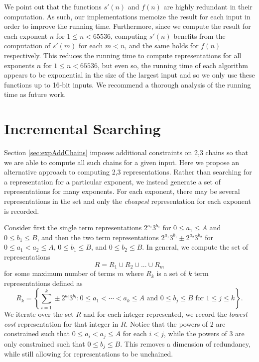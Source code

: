 \documentclass{ucalgthes1}
\theoremstyle{definition}
\begin{document}
We point out that the functions $s'(n)$ and $f(n)$ are highly redundant in their computation.  As such, our implementations memoize the result for each input in order to improve the running time.  Furthermore, since we compute the result for each exponent $n$ for $1 \le n < 65536$, computing $s'(n)$ benefits from the computation of $s'(m)$ for each $m < n$, and the same holds for $f(n)$ respectively.  This reduces the running time to compute representations for all exponents $n$ for $1 \le n < 65536$, but even so, the running time of each algorithm appears to be exponential in the size of the largest input and so we only use these functions up to 16-bit inputs.  We recommend a thorough analysis of the running time as future work.


\section{Incremental Searching}
\label{sec:expIncrSearch}

Section \ref{sec:expAddChains} imposes additional constraints on 2,3 chains so that we are able to compute all such chains for a given input.  Here we propose an alternative approach to computing 2,3 representations.  Rather than searching for a representation for a particular exponent, we instead generate a set of representations for many exponents.  For each exponent, there may be several representations in the set and only the \emph{cheapest} representation for each exponent is recorded.

Consider first the single term representations $2^{a_1}3^{b_1}$ for $0 \le a_1 \le A$ and $0 \le b_1 \le B$, and then the two term representations $2^{a_1}3^{b_1} \pm 2^{a_2}3^{b_2}$ for $0 \le a_1 < a_2 \le A$, $0 \le b_1 \le B$, and $0 \le b_2 \le B$.   In general, we compute the set of representations
\[
R = R_1 \cup R_2 \cup ... \cup R_m
\]
for some maximum number of terms $m$ where $R_k$ is a set of $k$ term representations defined as
\[
R_k = \left\{\sum_{i=1}^k\pm 2^{a_i}3^{b_i} : 0 \le a_1 < \cdots < a_k \le A \textrm{ and } 0 \le b_j \le B \textrm{ for } 1 \le j \le k \right\}.
\]
We iterate over the set $R$ and for each integer represented, we record the \emph{lowest cost} representation for that integer in $R$.  Notice that the powers of 2 are constrained such that $0 \le a_i < a_j \le A$ for each $i < j$, while the powers of 3 are only constrained such that $0 \le b_j \le B$.  This removes a dimension of redundancy, while still allowing for representations to be unchained.
\end{document}
